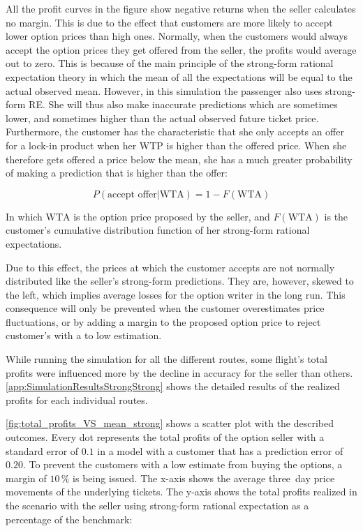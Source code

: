 All the profit curves in the figure show negative returns when the seller calculates no margin. This is due to the effect that customers are more likely to accept lower option prices than high ones. Normally, when the customers would always accept the option prices they get offered from the seller, the profits would average out to zero. This is because of the main principle of the strong-form rational expectation theory in which the mean of all the expectations will be equal to the actual observed mean. However, in this simulation the passenger also uses strong-form RE. She will thus also make inaccurate predictions which are sometimes lower, and sometimes higher than the actual observed future ticket price. Furthermore, the customer has the characteristic that she only accepts an offer for a lock-in product when her WTP is higher than the offered price. When she therefore gets offered a price below the mean, she has a much greater probability of making a prediction that is higher than the offer:

$$ P(\mbox{accept offer} | \mbox{WTA})  = 1 - F(\mbox{WTA})  $$

In which $\mbox{WTA}$ is the option price proposed by the seller, and $F(\mbox{WTA})$ is the customer's cumulative distribution function of her strong-form rational expectations.

Due to this effect, the prices at which the customer accepts are not normally distributed like the seller's strong-form predictions. They are, however, skewed to the left, which implies average losses for the option writer in the long run. This consequence will only be prevented when the customer overestimates price fluctuations, or by adding a margin to the proposed option price to reject customer's with a to low estimation.

While running the simulation for all the different routes, some flight's total profits were influenced more by the decline in accuracy for the seller than others. \autoref{app:SimulationResultsStrongStrong} shows the detailed results of the realized profits for each individual routes.

\autoref{fig:total_profits_VS_mean_strong} shows a scatter plot with the described outcomes. Every dot represents the total profits of the option seller with a standard error of $0.1$ in a model with a customer that has a prediction error of $0.20$. To prevent the customers with a low estimate from buying the options, a margin of $10\,\%$ is being issued. The x-axis shows the average three~day price movements of the underlying tickets. The y-axis shows the total profits realized in the scenario with the seller using strong-form rational expectation as a percentage of the benchmark:

